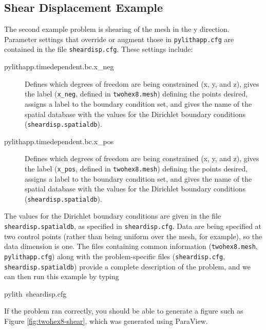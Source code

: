 \subsection{Shear Displacement Example}

The second example problem is shearing of the mesh in the y direction.
Parameter settings that override or augment those in \texttt{pylithapp.cfg}
are contained in the file \texttt{sheardisp.cfg}. These settings include:
\begin{description}
\item [{pylithapp.timedependent.bc.x\_neg}] Defines which degrees of freedom
are being constrained (x, y, and z), gives the label (\texttt{x\_neg},
defined in \texttt{twohex8.mesh}) defining the points desired, assigns
a label to the boundary condition set, and gives the name of the spatial
database with the values for the Dirichlet boundary conditions (\texttt{sheardisp.spatialdb}).
\item [{pylithapp.timedependent.bc.x\_pos}] Defines which degrees of freedom
are being constrained (x, y, and z), gives the label (\texttt{x\_pos},
defined in \texttt{twohex8.mesh}) defining the points desired, assigns
a label to the boundary condition set, and gives the name of the spatial
database with the values for the Dirichlet boundary conditions (\texttt{sheardisp.spatialdb}).
\end{description}
The values for the Dirichlet boundary conditions are given in the
file \texttt{sheardisp.spatialdb}, as specified in \texttt{sheardisp.cfg}.
Data are being specified at two control points (rather than being
uniform over the mesh, for example), so the data dimension is one.
The files containing common information (\texttt{twohex8.mesh}, \texttt{pylithapp.cfg})
along with the problem-specific files (\texttt{sheardisp.cfg}, \texttt{sheardisp.spatialdb})
provide a complete description of the problem, and we can then run
this example by typing
\begin{lyxcode}
pylith~sheardisp.cfg
\end{lyxcode}
If the problem ran correctly, you should be able to generate a figure
such as Figure \ref{fig:twohex8-shear}, which was generated using
ParaView.

